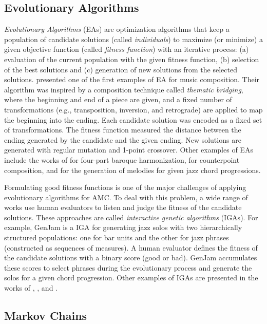 \subsection{Evolutionary Algorithms}

\textit{Evolutionary Algorithms} (EAs) are optimization algorithms that keep a population of candidate solutions (called \textit{individuals}) to maximize (or minimize) a given objective function (called \textit{fitness function}) with an iterative process: (a) evaluation of the current population with the given fitness function, (b) selection of the best solutions and (c) generation of new solutions from the selected solutions. \citet{horner1991genetic} presented one of the first examples of EA for music composition. Their algorithm was inspired by a composition technique called \textit{thematic bridging}, where the beginning and end of a piece are given, and a fixed number of transformations (e.g., transposition, inversion, and retrograde) are applied to map the beginning into the ending. Each candidate solution was encoded as a fixed set of transformations. The fitness function measured the distance between the ending generated by the candidate and the given ending. New solutions are generated with regular mutation and 1-point crossover. Other examples of EAs include the works of \citet{mcintyre1994bach} for four-part baroque harmonization, \citet{polito1997musica} for counterpoint composition, and \citet{papadopoulos1998genetic} for the generation of melodies for given jazz chord progressions.

Formulating good fitness functions is one of the major challenges of applying evolutionary algorithms for AMC. To deal with this problem, a wide range of works use human evaluators to listen and judge the fitness of the candidate solutions. These approaches are called \textit{interactive genetic algorithms} (IGAs). For example, GenJam \cite{biles1994genjam} is a IGA for generating jazz solos with two hierarchically structured populations: one for bar units and the other for jazz phrases (constructed as sequences of measures). A human evaluator defines the fitness of the candidate solutions with a binary score (good or bad). GenJam accumulates these scores to select phrases during the evolutionary process and generate the solos for a given chord progression. Other examples of IGAs are presented in the works of \citet{jacob1995composing}, \citet{schmidl2008pseudo}, and \citet{tokui2000music}.

\subsection{Markov Chains}

